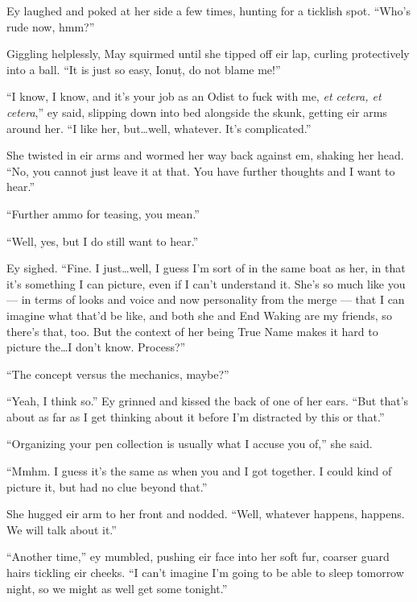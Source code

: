 Ey laughed and poked at her side a few times, hunting for a ticklish spot. ``Who's rude now, hmm?''

Giggling helplessly, May squirmed until she tipped off eir lap, curling protectively into a ball. ``It is just so easy, Ionuț, do not blame me!''

``I know, I know, and it's your job as an Odist to fuck with me, \emph{et cetera, et cetera},'' ey said, slipping down into bed alongside the skunk, getting eir arms around her. ``I like her, but\ldots well, whatever. It's complicated.''

She twisted in eir arms and wormed her way back against em, shaking her head. ``No, you cannot just leave it at that. You have further thoughts and I want to hear.''

``Further ammo for teasing, you mean.''

``Well, yes, but I do still want to hear.''

Ey sighed. ``Fine. I just\ldots well, I guess I'm sort of in the same boat as her, in that it's something I can picture, even if I can't understand it. She's so much like you — in terms of looks and voice and now personality from the merge — that I can imagine what that'd be like, and both she and End Waking are my friends, so there's that, too. But the context of her being True Name makes it hard to picture the\ldots I don't know. Process?''

``The concept versus the mechanics, maybe?''

``Yeah, I think so.'' Ey grinned and kissed the back of one of her ears. ``But that's about as far as I get thinking about it before I'm distracted by this or that.''

``Organizing your pen collection is usually what I accuse you of,'' she said.

``Mmhm. I guess it's the same as when you and I got together. I could kind of picture it, but had no clue beyond that.''

She hugged eir arm to her front and nodded. ``Well, whatever happens, happens. We will talk about it.''

``Another time,'' ey mumbled, pushing eir face into her soft fur, coarser guard hairs tickling eir cheeks. ``I can't imagine I'm going to be able to sleep tomorrow night, so we might as well get some tonight.''
